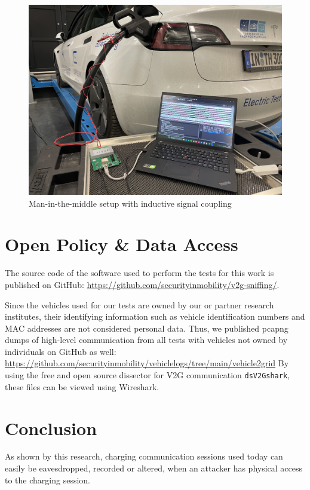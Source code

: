 \documentclass[sigconf]{acmart}
\begin{document}
\begin{figure}[ht]
    \centering
    \includegraphics[width=1\linewidth]{graphics/tesla-inductive-mitm.jpg}
    \caption{Man-in-the-middle setup with inductive signal coupling}
    \label{fig:inductive}
\end{figure}

\section{Open Policy \& Data Access}
The source code of the software used to perform the tests for this work is published on GitHub: \url{https://github.com/securityinmobility/v2g-sniffing/}.

Since the vehicles used for our tests are owned by our or partner research institutes, their identifying information such as vehicle identification numbers and MAC addresses are not considered personal data.
Thus, we published pcapng dumps of high-level communication from all tests with vehicles not owned by individuals on GitHub as well: \url{https://github.com/securityinmobility/vehiclelogs/tree/main/vehicle2grid}
By using the free and open source dissector for V2G communication \texttt{dsV2Gshark}\cite{dspace_dsv2gshark_nodate}, these files can be viewed using Wireshark\cite{wireshark_wireshark_nodate}.

\section{Conclusion}
As shown by this research, charging communication sessions used today can easily be eavesdropped, recorded or altered, when an attacker has physical access to the charging session.
\end{document}
